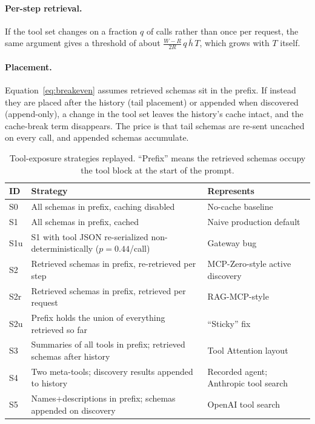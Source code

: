 \documentclass[11pt]{article}
\begin{document}
\paragraph{Per-step retrieval.} If the tool set changes on a fraction $q$ of calls rather than once per request, the same argument gives a threshold of about $\frac{W-R}{2R}\,q\,\bar h\,T$, which grows with $T$ itself.

\paragraph{Placement.} Equation~\ref{eq:breakeven} assumes retrieved schemas sit in the prefix. If instead they are placed after the history (tail placement) or appended when discovered (append-only), a change in the tool set leaves the history's cache intact, and the cache-break term disappears. The price is that tail schemas are re-sent uncached on every call, and appended schemas accumulate.

\begin{table}[t]
\centering\small
\caption{Tool-exposure strategies replayed. ``Prefix'' means the retrieved schemas occupy the tool block at the start of the prompt.}
\label{tab:strategies}
\begin{tabular}{@{}lll@{}}
\toprule
ID & Strategy & Represents \\
\midrule
S0 & All schemas in prefix, caching disabled & No-cache baseline \\
S1 & All schemas in prefix, cached & Naive production default \\
S1u & S1 with tool JSON re-serialized non-deterministically ($p{=}0.44$/call) & Gateway bug~\cite{bifrost} \\
S2 & Retrieved schemas in prefix, re-retrieved per step & MCP-Zero-style active discovery~\cite{mcpzero} \\
S2r & Retrieved schemas in prefix, retrieved per request & RAG-MCP-style~\cite{ragmcp} \\
S2u & Prefix holds the union of everything retrieved so far & ``Sticky'' fix \\
S3 & Summaries of all tools in prefix; retrieved schemas after history & Tool Attention layout~\cite{toolattention} \\
S4 & Two meta-tools; discovery results appended to history & Recorded agent; Anthropic tool search~\cite{anth_toolsearch} \\
S5 & Names+descriptions in prefix; schemas appended on discovery & OpenAI tool search~\cite{oai_toolsearch} \\
\bottomrule
\end{tabular}
\end{table}
\end{document}
